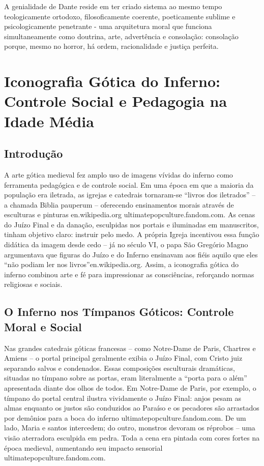 A genialidade de Dante reside em ter criado sistema ao mesmo tempo teologicamente ortodoxo, filosoficamente coerente, poeticamente sublime e psicologicamente penetrante - uma arquitetura moral que funciona simultaneamente como doutrina, arte, advertência e consolação: consolação porque, mesmo no horror, há ordem, racionalidade e justiça perfeita.

\section{Iconografia Gótica do Inferno: Controle Social e Pedagogia na Idade Média}

\subsection{Introdução}

A arte gótica medieval fez amplo uso de imagens vívidas do inferno como ferramenta pedagógica e de controle social. Em uma época em que a maioria da população era iletrada, as igrejas e catedrais tornaram-se “livros dos iletrados” -- a chamada Biblia pauperum -- oferecendo ensinamentos morais através de esculturas e pinturas en.wikipedia.org ultimatepopculture.fandom.com. As cenas do Juízo Final e da danação, esculpidas nos portais e iluminadas em manuscritos, tinham objetivo claro: instruir pelo medo. A própria Igreja incentivou essa função didática da imagem desde cedo -- já no século VI, o papa São Gregório Magno argumentava que figuras do Juízo e do Inferno ensinavam aos fiéis aquilo que eles “não podiam ler nos livros”en.wikipedia.org. Assim, a iconografia gótica do inferno combinou arte e fé para impressionar as consciências, reforçando normas religiosas e sociais.

\subsection{O Inferno nos Tímpanos Góticos: Controle Moral e Social}

Nas grandes catedrais góticas francesas -- como Notre-Dame de Paris, Chartres e Amiens -- o portal principal geralmente exibia o Juízo Final, com Cristo juiz separando salvos e condenados. Essas composições esculturais dramáticas, situadas no tímpano sobre as portas, eram literalmente a “porta para o além” apresentada diante dos olhos de todos. Em Notre-Dame de Paris, por exemplo, o tímpano do portal central ilustra vividamente o Juízo Final: anjos pesam as almas enquanto os justos são conduzidos ao Paraíso e os pecadores são arrastados por demônios para a boca do inferno ultimatepopculture.fandom.com. De um lado, Maria e santos intercedem; do outro, monstros devoram os réprobos -- uma visão aterradora esculpida em pedra. Toda a cena era pintada com cores fortes na época medieval, aumentando seu impacto sensorial ultimatepopculture.fandom.com.

